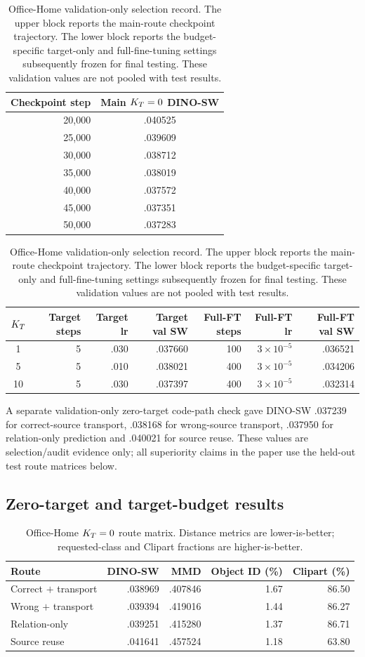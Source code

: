\begin{table}[h]
\centering\small
\caption{Office-Home validation-only selection record. The upper block reports the main-route checkpoint trajectory. The lower block reports the budget-specific target-only and full-fine-tuning settings subsequently frozen for final testing. These validation values are not pooled with test results.}
\label{tab:office-selection}
\begin{tabular}{rc}
\toprule
Checkpoint step & Main $K_T=0$ DINO-SW\\
\midrule
20,000 & .040525\\
25,000 & .039609\\
30,000 & .038712\\
35,000 & .038019\\
40,000 & .037572\\
45,000 & .037351\\
50,000 & .037283\\
\bottomrule
\end{tabular}

\vspace{4pt}
\begin{tabular}{crrrrrr}
\toprule
$K_T$ & Target steps & Target lr & Target val SW & Full-FT steps & Full-FT lr & Full-FT val SW\\
\midrule
1 & 5 & .030 & .037660 & 100 & $3{\times}10^{-5}$ & .036521\\
5 & 5 & .010 & .038021 & 400 & $3{\times}10^{-5}$ & .034206\\
10 & 5 & .030 & .037397 & 400 & $3{\times}10^{-5}$ & .032314\\
\bottomrule
\end{tabular}
\end{table}

A separate validation-only zero-target code-path check gave DINO-SW .037239 for correct-source transport, .038168 for wrong-source transport, .037950 for relation-only prediction and .040021 for source reuse. These values are selection/audit evidence only; all superiority claims in the paper use the held-out test route matrices below.

\subsection{Zero-target and target-budget results}
\begin{table}[h]
\centering\small
\caption{Office-Home $K_T=0$ route matrix. Distance metrics are lower-is-better; requested-class and Clipart fractions are higher-is-better.}
\begin{tabular}{lrrrr}
\toprule
Route & DINO-SW & MMD & Object ID (\%) & Clipart (\%)\\
\midrule
Correct $+$ transport & .038969 & .407846 & 1.67 & 86.50\\
Wrong $+$ transport & .039394 & .419016 & 1.44 & 86.27\\
Relation-only & .039251 & .415280 & 1.37 & 86.71\\
Source reuse & .041641 & .457524 & 1.18 & 63.80\\
\bottomrule
\end{tabular}
\end{table}

